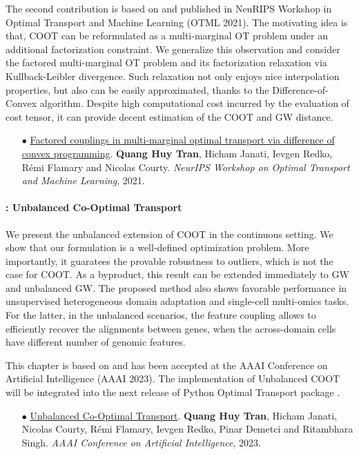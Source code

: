 The second contribution is based on \citep{Tran21} and published in NeuRIPS Workshop in Optimal
Transport and Machine Learning (OTML 2021). The motivating idea is that,
COOT can be reformulated as a multi-marginal OT problem under an additional factorization constraint.
We generalize this observation and consider the factored multi-marginal OT problem
and its factorization relaxation via Kullback-Leibler divergence.
Such relaxation not only enjoys nice interpolation properties, but also
can be easily approximated, thanks to the Difference-of-Convex algorithm.
Despite high computational cost incurred by the evaluation of cost tensor,
it can provide decent estimation of the COOT and GW distance.

\begin{itemize}
    \item[$\bullet$] \ul{Factored couplings in multi-marginal optimal transport via difference of
    convex programming}. \textbf{Quang Huy Tran}, Hicham Janati, Ievgen Redko,
    Rémi Flamary and Nicolas Courty.
    \textit{NeurIPS Workshop on Optimal Transport and Machine Learning}, 2021.
\end{itemize}

\paragraph{: Unbalanced Co-Optimal Transport}

We present the unbalanced extension of COOT in the continuous setting.
We show that our formulation is a well-defined optimization problem.
More importantly, it guaratees the provable robustness to outliers, which is not the case for COOT.
As a byproduct, this result can be extended immediately to GW and unbalanced GW.
The proposed method also shows favorable performance in
unsupervised heterogeneous domain adaptation and single-cell multi-omics tasks.
For the latter, in the unbalanced scenarios, the feature coupling allows to efficiently recover
the alignments between genes, when the across-domain cells have
different number of genomic features.

This chapter is based on \citep{Tran23} and has been accepted at the
AAAI Conference on Artificial Intelligence (AAAI 2023). The implementation of
Unbalanced COOT will be
integrated into the next release of Python Optimal Transport package \citep{Flamary21}.

\begin{itemize}
    \item[$\bullet$] \ul{Unbalanced Co-Optimal Transport}. \textbf{Quang Huy Tran}, Hicham Janati,
    Nicolas Courty, Rémi Flamary, Ievgen Redko, Pinar Demetci and Ritambhara Singh.
    \textit{AAAI Conference on Artificial Intelligence}, 2023.
\end{itemize}

